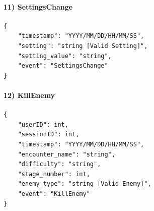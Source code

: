 \paragraph{11) SettingsChange}
\begin{verbatim}
{
    "timestamp": "YYYY/MM/DD/HH/MM/SS",
    "setting": "string [Valid Setting]",
    "setting_value": "string",
    "event": "SettingsChange"
}
\end{verbatim}

\newpage
\paragraph{12) KillEnemy}
\begin{verbatim}
{
    "userID": int,
    "sessionID": int,
    "timestamp": "YYYY/MM/DD/HH/MM/SS",
    "encounter_name": "string",
    "difficulty": "string",
    "stage_number": int,
    "enemy_type": "string [Valid Enemy]",
    "event": "KillEnemy"
}
\end{verbatim}
